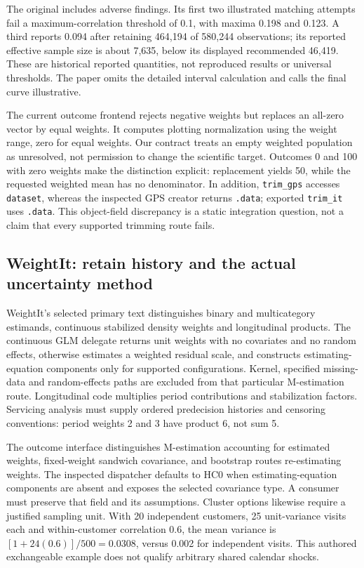 The original includes adverse findings. Its first two illustrated matching
attempts fail a maximum-correlation threshold of 0.1, with maxima 0.198 and
0.123. A third reports 0.094 after retaining 464,194 of 580,244 observations;
its reported effective sample size is about 7,635, below its displayed
recommended 46,419. These are historical reported quantities, not reproduced
results or universal thresholds. The paper omits the detailed interval
calculation and calls the final curve illustrative.
\citep{exec24_dose_original}

The current outcome frontend rejects negative weights but replaces an all-zero
vector by equal weights. It computes plotting normalization using the weight
range, zero for equal weights. Our contract treats an empty weighted population
as unresolved, not permission to change the scientific target. Outcomes 0 and
100 with zero weights make the distinction explicit: replacement yields 50,
while the requested weighted mean has no denominator. In addition,
\texttt{trim\_gps} accesses \texttt{dataset}, whereas the inspected GPS creator
returns \texttt{.data}; exported \texttt{trim\_it} uses \texttt{.data}.
This object-field discrepancy is a static integration question, not a claim
that every supported trimming route fails.
\citep{exec24_dose_causalgps,exec24_dose_contract}

\subsection{WeightIt: retain history and the actual uncertainty method}
WeightIt's selected primary text distinguishes binary and multicategory
estimands, continuous stabilized density weights and longitudinal products.
The continuous GLM delegate returns unit weights with no covariates and no
random effects, otherwise estimates a weighted residual scale, and constructs
estimating-equation components only for supported configurations. Kernel,
specified missing-data and random-effects paths are excluded from that
particular M-estimation route. Longitudinal code multiplies period
contributions and stabilization factors. Servicing analysis must supply ordered
predecision histories and censoring conventions: period weights 2 and 3 have
product 6, not sum 5.
\citep{exec24_dose_weightit,exec24_dose_contract}

The outcome interface distinguishes M-estimation accounting for estimated
weights, fixed-weight sandwich covariance, and bootstrap routes re-estimating
weights. The inspected dispatcher defaults to HC0 when estimating-equation
components are absent and exposes the selected covariance type. A consumer
must preserve that field and its assumptions. Cluster options likewise require
a justified sampling unit. With 20 independent customers, 25 unit-variance
visits each and within-customer correlation 0.6, the mean variance is
$[1+24(0.6)]/500=0.0308$, versus 0.002 for independent visits. This authored
exchangeable example does not qualify arbitrary shared calendar shocks.
\citep{exec24_dose_weightit,exec24_dose_contract}

